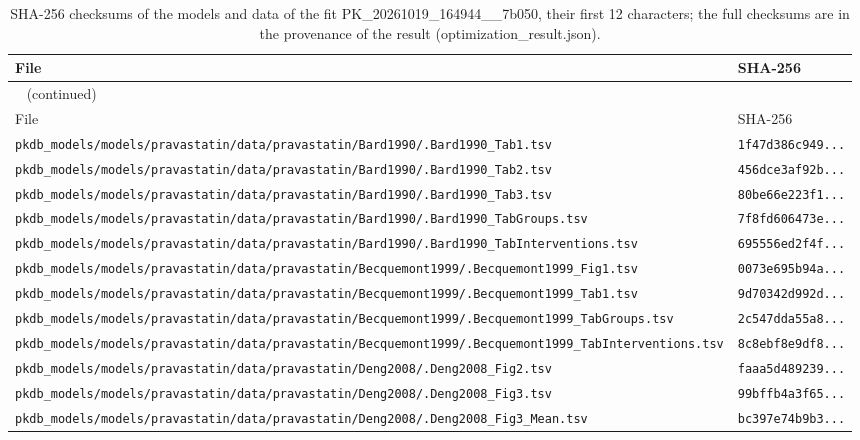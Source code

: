 \documentclass{article}
\begin{document}
\begin{longtable}{ll}
\caption{SHA-256 checksums of the models and data of the fit PK\_20261019\_164944\_\_7b050, their first 12 characters; the full checksums are in the provenance of the result (optimization\_result.json).}\label{tab:checksums:PK_20261019_164944__7b050} \\
\toprule
File & SHA-256 \\
\midrule
\endfirsthead
\multicolumn{2}{l}{\small\tablename~\thetable{} (continued)} \\
\toprule
File & SHA-256 \\
\midrule
\endhead
\bottomrule
\endlastfoot
\texttt{pkdb\_models/models/pravastatin/data/pravastatin/Bard1990/.Bard1990\_Tab1.tsv} & \texttt{1f47d386c949...} \\
\texttt{pkdb\_models/models/pravastatin/data/pravastatin/Bard1990/.Bard1990\_Tab2.tsv} & \texttt{456dce3af92b...} \\
\texttt{pkdb\_models/models/pravastatin/data/pravastatin/Bard1990/.Bard1990\_Tab3.tsv} & \texttt{80be66e223f1...} \\
\texttt{pkdb\_models/models/pravastatin/data/pravastatin/Bard1990/.Bard1990\_TabGroups.tsv} & \texttt{7f8fd606473e...} \\
\texttt{pkdb\_models/models/pravastatin/data/pravastatin/Bard1990/.Bard1990\_TabInterventions.tsv} & \texttt{695556ed2f4f...} \\
\texttt{pkdb\_models/models/pravastatin/data/pravastatin/Becquemont1999/.Becquemont1999\_Fig1.tsv} & \texttt{0073e695b94a...} \\
\texttt{pkdb\_models/models/pravastatin/data/pravastatin/Becquemont1999/.Becquemont1999\_Tab1.tsv} & \texttt{9d70342d992d...} \\
\texttt{pkdb\_models/models/pravastatin/data/pravastatin/Becquemont1999/.Becquemont1999\_TabGroups.tsv} & \texttt{2c547dda55a8...} \\
\texttt{pkdb\_models/models/pravastatin/data/pravastatin/Becquemont1999/.Becquemont1999\_TabInterventions.tsv} & \texttt{8c8ebf8e9df8...} \\
\texttt{pkdb\_models/models/pravastatin/data/pravastatin/Deng2008/.Deng2008\_Fig2.tsv} & \texttt{faaa5d489239...} \\
\texttt{pkdb\_models/models/pravastatin/data/pravastatin/Deng2008/.Deng2008\_Fig3.tsv} & \texttt{99bffb4a3f65...} \\
\texttt{pkdb\_models/models/pravastatin/data/pravastatin/Deng2008/.Deng2008\_Fig3\_Mean.tsv} & \texttt{bc397e74b9b3...} \\

\end{longtable}
\end{document}
